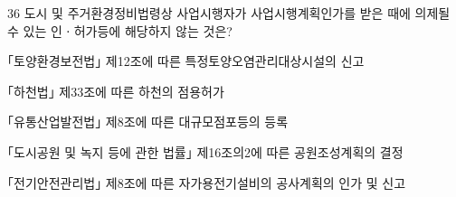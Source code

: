 \begin{question}{36}
도시 및 주거환경정비법령상 사업시행자가 사업시행계획인가를 받은 때에 의제될 수 있는 인ㆍ허가등에 해당하지 않는 것은?
\begin{choices}
  \item ｢토양환경보전법｣ 제12조에 따른 특정토양오염관리대상시설의 신고
  \item ｢하천법｣ 제33조에 따른 하천의 점용허가
  \item ｢유통산업발전법｣ 제8조에 따른 대규모점포등의 등록
  \item ｢도시공원 및 녹지 등에 관한 법률｣ 제16조의2에 따른 공원조성계획의 결정
  \item ｢전기안전관리법｣ 제8조에 따른 자가용전기설비의 공사계획의 인가 및 신고
\end{choices}
\end{question}
